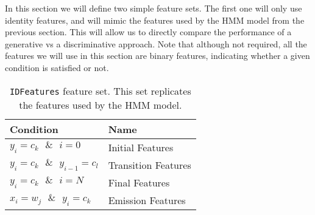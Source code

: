 In this section we will define two simple feature sets. The first one
will only use identity features, and will mimic the features used by
the HMM model from the previous section. This will allow us to directly
compare the performance of a generative vs a discriminative
approach. Note that although not required, all the features we will use
in this section are binary features, indicating whether a given condition 
is satisfied or not. 

\begin{table}[h!]
\begin{center}
\begin{tabular}{|l|l|}
\hline
Condition & Name\\
\hline
$y_i = c_k \text{  } \& \text{  } i =0 $& Initial Features \\
\hline
$y_i = c_k \text{  } \& \text{  } y_{i-1} = c_l$& Transition Features \\
\hline
$y_i = c_k \text{  } \& \text{  } i = N$& Final Features \\
\hline
$x_i = w_j \text{  } \& \text{  } y_i = c_k$ & Emission Features \\
\hline
\end{tabular}
\caption{\label{id-features} {\tt IDFeatures} feature set. This set
  replicates the features used by the HMM model.}
\end{center}
\end{table}


